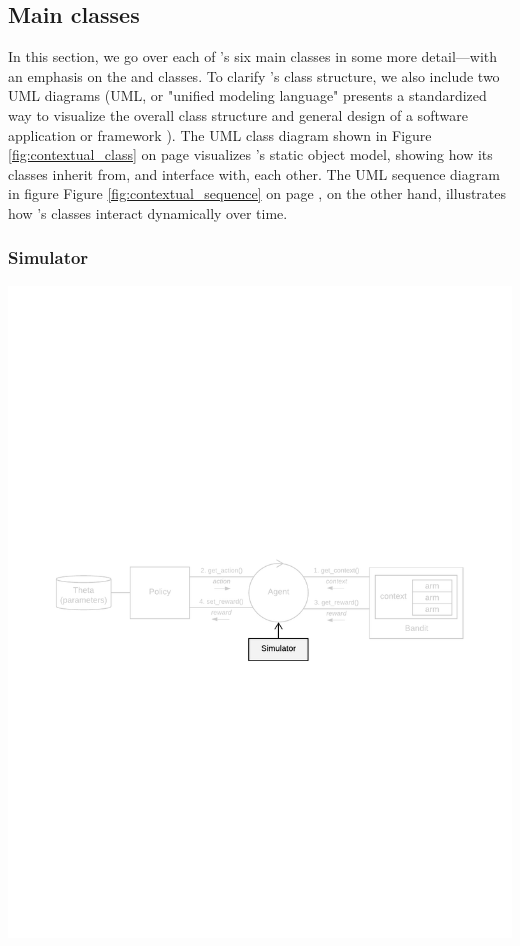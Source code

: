 \documentclass{jss}
\begin{document}
\subsection{Main classes} \label{mainclasses}

In this section, we go over each of 's six main classes in some more detail---with an emphasis on the  and  classes. To clarify 's class structure, we also include two UML diagrams (UML, or "unified modeling language" presents a standardized way to visualize the overall class structure and general design of a software application or framework \citep{Rumbaugh2004}). The UML class diagram shown in Figure \ref{fig:contextual_class} on page \pageref{fig:contextual_class} visualizes 's static object model, showing how its classes inherit from, and interface with, each other. The UML sequence diagram in figure Figure \ref{fig:contextual_sequence} on page \pageref{fig:contextual_sequence}, on the other hand, illustrates how 's classes interact dynamically over time.

\subsubsection{Simulator}

\includegraphics[width=\textwidth]{fig/all_cmab_phases_Part1}
\end{document}
